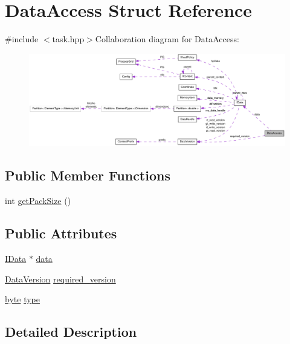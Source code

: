 \hypertarget{struct_data_access}{
\section{DataAccess Struct Reference}
\label{struct_data_access}
}


{\ttfamily \#include $<$task.hpp$>$}Collaboration diagram for DataAccess:\nopagebreak
\begin{figure}[H]
\begin{center}
\leavevmode
\includegraphics[width=400pt]{struct_data_access__coll__graph}
\end{center}
\end{figure}
\subsection*{Public Member Functions}
\begin{DoxyCompactItemize}
\item 
int \hyperlink{struct_data_access_a13f389073a0d531058175bd927ca762a}{getPackSize} ()
\end{DoxyCompactItemize}
\subsection*{Public Attributes}
\begin{DoxyCompactItemize}
\item 
\hyperlink{class_i_data}{IData} $\ast$ \hyperlink{struct_data_access_a870b7cae3b37240d32647683d1fee440}{data}
\item 
\hyperlink{struct_data_version}{DataVersion} \hyperlink{struct_data_access_a96ee68f6c0475d76d09a15b437746d8b}{required\_\-version}
\item 
\hyperlink{engine_8hpp_a0c8186d9b9b7880309c27230bbb5e69d}{byte} \hyperlink{struct_data_access_a8ca53e9ad20a0f233f4c9f0f42f4c967}{type}
\end{DoxyCompactItemize}


\subsection{Detailed Description}


